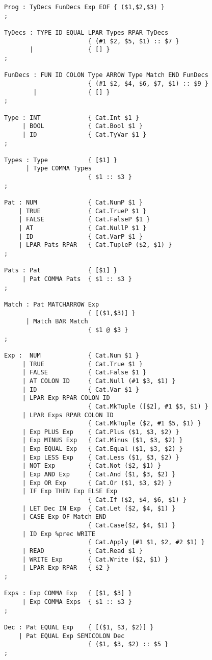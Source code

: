 \begin{lstlisting}
Prog : TyDecs FunDecs Exp EOF { ($1,$2,$3) }
;

TyDecs : TYPE ID EQUAL LPAR Types RPAR TyDecs
                       { (#1 $2, $5, $1) :: $7 }
       |               { [] }
;

FunDecs : FUN ID COLON Type ARROW Type Match END FunDecs
                       { (#1 $2, $4, $6, $7, $1) :: $9 }
        |              { [] }
;

Type : INT             { Cat.Int $1 }
     | BOOL            { Cat.Bool $1 }
     | ID              { Cat.TyVar $1 }
;

Types : Type           { [$1] }
      | Type COMMA Types
                       { $1 :: $3 }
;

Pat : NUM              { Cat.NumP $1 }
    | TRUE             { Cat.TrueP $1 }
    | FALSE            { Cat.FalseP $1 }
    | AT               { Cat.NullP $1 }
    | ID               { Cat.VarP $1 }
    | LPAR Pats RPAR   { Cat.TupleP ($2, $1) }
;

Pats : Pat             { [$1] }
     | Pat COMMA Pats  { $1 :: $3 }
;

Match : Pat MATCHARROW Exp
                       { [($1,$3)] }
      | Match BAR Match
                       { $1 @ $3 }
;

Exp :  NUM             { Cat.Num $1 }
     | TRUE            { Cat.True $1 }
     | FALSE           { Cat.False $1 }
     | AT COLON ID     { Cat.Null (#1 $3, $1) }
     | ID              { Cat.Var $1 }
     | LPAR Exp RPAR COLON ID
                       { Cat.MkTuple ([$2], #1 $5, $1) }
     | LPAR Exps RPAR COLON ID
                       { Cat.MkTuple ($2, #1 $5, $1) }
     | Exp PLUS Exp    { Cat.Plus ($1, $3, $2) }
     | Exp MINUS Exp   { Cat.Minus ($1, $3, $2) }
     | Exp EQUAL Exp   { Cat.Equal ($1, $3, $2) }
     | Exp LESS Exp    { Cat.Less ($1, $3, $2) }
     | NOT Exp         { Cat.Not ($2, $1) }
     | Exp AND Exp     { Cat.And ($1, $3, $2) }
     | Exp OR Exp      { Cat.Or ($1, $3, $2) }
     | IF Exp THEN Exp ELSE Exp
                       { Cat.If ($2, $4, $6, $1) }
     | LET Dec IN Exp  { Cat.Let ($2, $4, $1) }
     | CASE Exp OF Match END
                       { Cat.Case($2, $4, $1) }
     | ID Exp %prec WRITE
                       { Cat.Apply (#1 $1, $2, #2 $1) }
     | READ            { Cat.Read $1 }
     | WRITE Exp       { Cat.Write ($2, $1) }
     | LPAR Exp RPAR   { $2 }
;

Exps : Exp COMMA Exp   { [$1, $3] }
     | Exp COMMA Exps  { $1 :: $3 }
;

Dec : Pat EQUAL Exp    { [($1, $3, $2)] }
    | Pat EQUAL Exp SEMICOLON Dec
                       { ($1, $3, $2) :: $5 }
;
\end{lstlisting}\label{lst:parse_prods}
